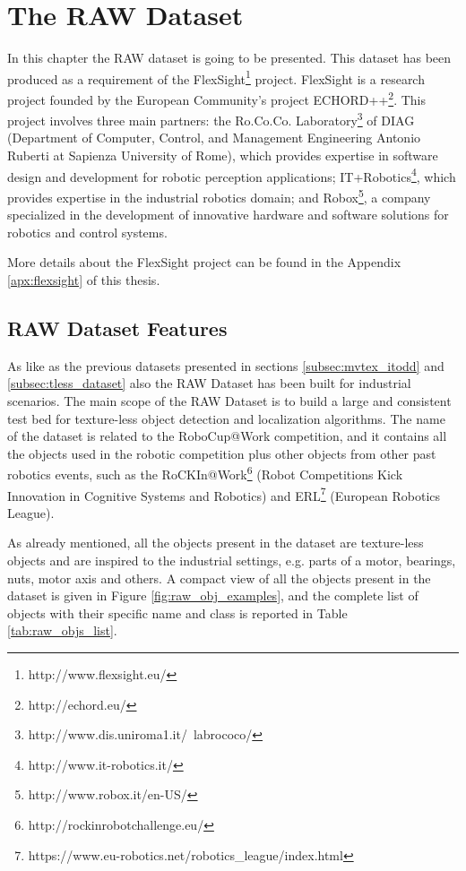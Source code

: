 \chapter{The RAW Dataset}\label{ch:raw_dataset}
In this chapter the RAW dataset is going to be presented. This dataset has been produced as a requirement of the FlexSight\footnote{http://www.flexsight.eu/} project. FlexSight is a research project founded by the European Community's project ECHORD++\footnote{http://echord.eu/}.  This project involves three main partners: the Ro.Co.Co. Laboratory\footnote{http://www.dis.uniroma1.it/~labrococo/} of DIAG (Department of Computer, Control, and Management Engineering  Antonio Ruberti at Sapienza University of Rome), which provides expertise in software design and development for robotic perception applications; IT+Robotics\footnote{http://www.it-robotics.it/}, which provides expertise in the industrial robotics domain; and Robox\footnote{http://www.robox.it/en-US/}, a company specialized in the development of innovative hardware and software solutions for robotics and control systems. 

More details about the FlexSight project can be found in the Appendix \ref{apx:flexsight} of this thesis.

\section{RAW Dataset Features}\label{sec:raw_features}
As like as the previous datasets presented in sections \ref{subsec:mvtex_itodd} and \ref{subsec:tless_dataset} also the RAW Dataset has been built for industrial scenarios. The main scope of the RAW Dataset is to build a large and consistent test bed for texture-less object detection and localization algorithms. The name of the dataset is related to the RoboCup@Work competition, 
 and it contains all the objects used in the robotic competition plus other objects from other past robotics events, such as the RoCKIn@Work\footnote{http://rockinrobotchallenge.eu/} (Robot Competitions Kick Innovation in Cognitive Systems and Robotics) and ERL\footnote{https://www.eu-robotics.net/robotics\_league/index.html} (European Robotics League). 

As already mentioned, all the objects present in the dataset are texture-less objects and are inspired to the industrial settings, e.g. parts of a motor, bearings, nuts, motor axis and others. A compact view of all the objects present in the dataset is given in Figure \ref{fig:raw_obj_examples}, and the complete list of objects with their specific name and class is reported in Table \ref{tab:raw_objs_list}.

